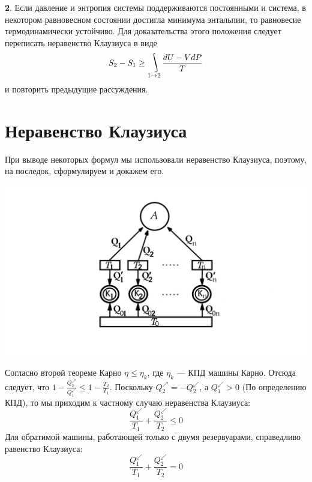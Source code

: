 \documentclass[a4paper,14pt]{article} %
\DeclareMathOperator*{\myint}{\ThisStyle{\rotatebox{25}{$\SavedStyle\!\int\!\!\!$}}}
\begin{document}
\textbf{2}. Если давление и энтропия системы поддерживаются постоянными и система, в некотором равновесном состоянии достигла минимума энтальпии, то равновесие термодинамически устойчиво.
Для доказательства этого положения следует переписать неравенство Клаузиуса в виде 
\[S_2 - S_1 \geq \myint_{1\rightarrow 2}{\frac{dU - VdP}{T}}\]
и повторить предыдущие рассуждения.

\section{Неравенство Клаузиуса}
При выводе некоторых формул мы использовали неравенство Клаузиуса, поэтому, на последок, сформулируем и докажем его.

\begin{center}
	{\centering \includegraphics[scale=0.2]{PICTURE_2.jpg}}	
\end{center}

Согласно второй теореме Карно $\eta \leq \eta_k$, где $\eta_k$ — КПД машины Карно. Отсюда следует, что $1 - \frac{Q_2^\nearrow}{Q_1^\swarrow} \leq 1 - \frac{T_2}{T_1}$. Поскольку $Q_2^\nearrow = - Q_2^\swarrow$, а $Q_1^\swarrow > 0$ (По определению КПД), то мы приходим к частному случаю неравенства Клаузиуса:
\[\frac{Q_1^\swarrow}{T_1} + \frac{Q_2^\swarrow}{T_2} \leq 0\]
Для обратимой машины, работающей
только с двумя резервуарами, справедливо равенство Клаузиуса:
\[\frac{Q_1^\swarrow}{T_1} + \frac{Q_2^\swarrow}{T_2} = 0\]
\end{document}
